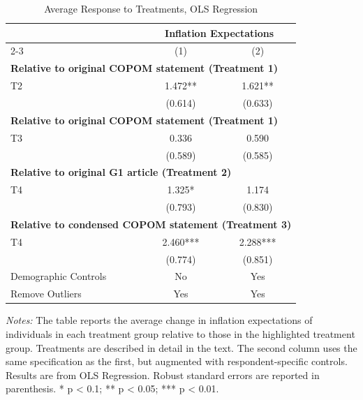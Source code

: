 
\begin{table}[H]
\centering
\caption{Average Response to Treatments, OLS Regression}
\label{tab:a1}
\begin{tabular}{lcc}
\toprule
\textbf{} & \multicolumn{2}{c}{\textbf{Inflation Expectations}}\\ 
\cmidrule(lr){2-3}
& (1) & (2) \\ 
\midrule
\multicolumn{3}{l}{\textbf{Relative to original COPOM statement (Treatment 1)}} \\
T2 & 1.472** & 1.621** \\
& (0.614) & (0.633) \\
\midrule
\multicolumn{3}{l}{\textbf{Relative to original COPOM statement (Treatment 1)}} \\
T3 & 0.336 & 0.590 \\
& (0.589) & (0.585) \\
\midrule
\multicolumn{3}{l}{\textbf{Relative to original G1 article (Treatment 2)}} \\
T4 & 1.325* & 1.174 \\
& (0.793) & (0.830) \\
\midrule
\multicolumn{3}{l}{\textbf{Relative to condensed COPOM statement (Treatment 3)}} \\
T4 & 2.460*** & 2.288*** \\
& (0.774) & (0.851) \\
\midrule
Demographic Controls & No & Yes \\
Remove Outliers & Yes & Yes \\
\bottomrule
\end{tabular}
\begin{minipage}{\textwidth}
    {\fontsize{8}{8}\selectfont\textit{Notes:} The table reports the average change in inflation expectations of individuals in each treatment group relative to those in the highlighted treatment group. Treatments are described in detail in the text. The second column uses the same specification as the first, but augmented with respondent-specific controls. Results are from OLS Regression. Robust standard errors are reported in parenthesis. * p < 0.1; ** p < 0.05; *** p < 0.01.}
\end{minipage}
\end{table}
